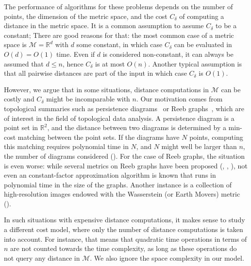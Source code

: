 \documentclass[a4paper,UKenglish,cleveref, autoref]{lipics-v2019}
\newcommand{\R}{\mathbb{R}}
\newcommand{\metricspace}{\mathcal{M}}
\newcommand{\dist}{\delta}
\newcommand{\complexity}{C_{\dist}}
\begin{document}
The performance of algorithms for these problems depends on the number of points,
the dimension of the metric space, and the cost $\complexity$ of computing a distance in the metric space.
It is a common assumption to assume $\complexity$ to be a constant; 
There are good reasons for that: the most common case of a metric space
is $\metricspace=\R^d$ with $d$ some constant, in which case $\complexity$ can be evaluated in $O(d)=O(1)$ time.
Even if $d$ is considered non-constant,
it can always be assumed that $d\leq n$, hence $\complexity$ is at most $O(n)$.
Another typical assumption is that all pairwise distances are part of the input
in which case $\complexity$ is $O(1)$.

However, we argue that in some situations, distance computations
in $\metricspace$ can be costly and $\complexity$ might be incomparable
with $n$. Our motivation comes from topological summaries
such as persistence diagrams~\cite{elz-topological} or Reeb graphs~\cite{reeb-survey}, which are of interest
in the field of topological data analysis. A persistence diagram
is a point set in $\R^2$, and the distance between two diagrams
is determined by a min-cost matching between the point sets.
If the diagrams have $N$ points, computing this matching requires
polynomial time in $N$, and $N$ might well be larger than $n$, the number
of diagrams considered (\cite{cohen2007stability}). For the case of Reeb graphs, the situation is even
worse: while several metrics on Reeb graphs have been proposed (\cite{bauer2014measuring}, \cite{de2016categorified},
\cite{di2016edit}),
not even an constant-factor approximation algorithm is known that runs
in polynomial time in the size of the graphs.
Another instance is a collection of high-resolution images
endowed with the Wasserstein (or Earth Movers) metric (\cite{rubner2000earth}).

In such situations with expensive distance computations, 
it makes sense to study a different cost model, where only the number of distance computations
is taken into account. For instance, that means that quadratic time operations in terms of $n$
are not counted towards the time complexity, as long as these operations do not query any distance
in $\metricspace$. We also ignore the space complexity in our model.
\end{document}
